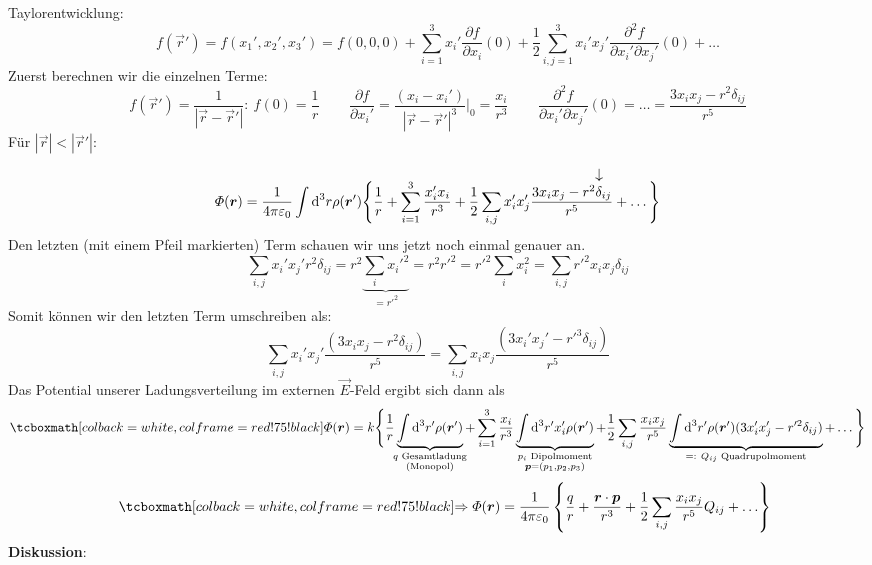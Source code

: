 Taylorentwicklung:
\[f(\vec{r}')=f(x_1',x_2',x_3')=f(0,0,0)+\sum_{i=1}^3x_i'\frac{\partial f}{\partial x_i}(0)+\frac{1}{2}\sum_{i,j=1}^3x_i'x_j'\frac{\partial^2f}{\partial x_i'\partial x_j'}(0)+\ldots\]
Zuerst berechnen wir die einzelnen Terme:
\[f(\vec{r}')=\frac{1}{|\vec{r}-\vec{r}'|}:\ f(0)=\frac{1}{r} \quad \ \ \ \ \  \frac{\partial f}{\partial x_i'}=\frac{(x_i-x_i')}{|\vec{r}-\vec{r}'|^3}\bigg|_0=\frac{x_i}{r^3} \quad \ \ \ \ \ \frac{\partial^2f}{\partial x_i'\partial x_j'}(0)=\ldots=\frac{3x_ix_j-r^2 \delta_{ij}}{r^5}\]
Für $|\vec{r}|<|\vec{r}'|$:
\vspace{-15pt} \[\Phi(\vec{r})=\frac{1}{4\pi\epsilon_0}\int\dd^3r\rho(\vec{r}')\Bigg\{\frac{1}{r}+\sum_{i=1}^3\frac{x_i'x_i}{r^3}+\frac{1}{2}\sum_{i,j}x_i'x_j'\frac{3x_ix_j-\custoup{\rightarrow}{r^2\delta_{ij}}{}}{r^5}+\ldots\Bigg\}\]
Den letzten (mit einem Pfeil markierten) Term schauen wir uns jetzt noch einmal genauer an.
\[\sum_{i,j}x_i'x_j'r^2\delta_{ij}=r^2\underbrace{\sum_ix_i'^2}_{=r'^2}=r^2r'^2=r'^2\sum_ix_i^2=\sum_{i,j}r'^2x_ix_j\delta_{ij}\]
Somit können wir den letzten Term umschreiben als:
\[\sum_{i,j}x_i'x_j'\frac{(3x_ix_j-r^2\delta_{ij})}{r^5}=\sum_{i,j}x_ix_j\frac{(3x_i'x_j'-r'^3\delta_{ij})}{r^5}\]
Das Potential unserer Ladungsverteilung im externen $ \vec{E} $-Feld ergibt sich dann als
\begingroup\makeatletter\def\f@size{10}\check@mathfonts
\def\maketag@@@#1{\hbox{\m@th\large\normalfont#1}}
\begin{equation*}
\rmbox{\Phi(\vec{r})=k\Bigg\{\frac{1}{r} \underbrace{\int\dd^3r'\rho(\vec{r}')}_{\mathclap{\substack{ q \textrm{ Gesamtladung} \\  \tx{(Monopol)}}}} +\sum_{i=1}^3\frac{x_i}{r^3} \underbrace{\int\dd^3r'x_i'\rho(\vec{r}')}_{\mathclap{\substack{p_i \textrm{ Dipolmoment} \\ \vec{p}=(p_1,p_2,p_3)}}}  +\frac{1}{2}\sum_{i,j}\frac{x_ix_j}{r^5}\underbrace{\int\dd^3r'\rho(\vec{r}')(3x_i'x_j'-r'^2\delta_{ij})}_{\mathclap{\eqdef\ Q_{ij}\textrm{ Quadrupolmoment}}}+\ldots\Bigg\}}
\end{equation*}\endgroup
\[\quad \rmbox{\Rightarrow\Phi(\vec{r})=\frac{1}{4\pi\epsilon_0}\left\{\frac{q}{r}+\frac{\vec{r}\cdot\vec{p}}{r^3}+\frac{1}{2}\sum_{i,j}\frac{x_ix_j}{r^5}Q_{ij}+\ldots\right\}}\]
\textbf{Diskussion}:
